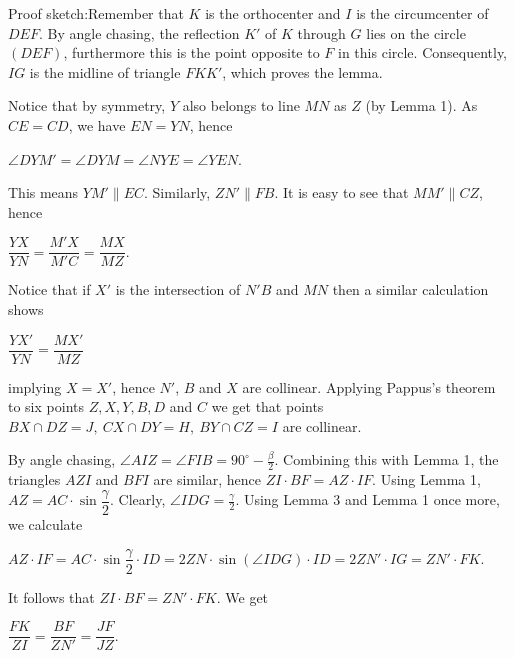 \documentclass{article}
\begin{document}
Proof sketch:Remember that \(\displaystyle K\) is the orthocenter and \(\displaystyle I\) is the circumcenter of \(\displaystyle DEF\). By angle chasing, the reflection \(\displaystyle K'\) of \(\displaystyle K\) through \(\displaystyle G\) lies on the circle \(\displaystyle (DEF)\), furthermore this is the point opposite to \(\displaystyle F\) in this circle. Consequently, \(\displaystyle IG\) is the midline of triangle \(\displaystyle FKK'\), which proves the lemma.

Notice that by symmetry, \(\displaystyle Y\) also belongs to line \(\displaystyle MN\) as \(\displaystyle Z\) (by Lemma 1). As \(\displaystyle CE=CD\), we have \(\displaystyle EN=YN\), hence

\(\displaystyle \angle DYM'=\angle DYM=\angle NYE=\angle YEN.\)

This means \(\displaystyle YM'\parallel EC\). Similarly, \(\displaystyle ZN'\parallel FB\). It is easy to see that \(\displaystyle MM'\parallel CZ\), hence

\(\displaystyle \dfrac{YX}{YN} = \dfrac{M'X}{M'C} =\dfrac{MX}{MZ} .\)

Notice that if \(\displaystyle X'\) is the intersection of \(\displaystyle N'B\) and \(\displaystyle MN\) then a similar calculation shows

\(\displaystyle \dfrac{YX'}{YN}=\dfrac{MX'}{MZ}\)

implying \(\displaystyle X=X'\), hence \(\displaystyle N'\), \(\displaystyle B\) and \(\displaystyle X\) are collinear. Applying Pappus's theorem to six points \(\displaystyle Z, X, Y, B, D\) and \(\displaystyle C\) we get that points \(\displaystyle BX\cap DZ = J, \ CX\cap DY = H, \ BY\cap CZ = I\) are collinear.

By angle chasing, \(\displaystyle \angle AIZ=\angle FIB=90^\circ-\frac{\beta}{2}\). Combining this with Lemma 1, the triangles \(\displaystyle AZI\) and \(\displaystyle BFI\) are similar, hence \(\displaystyle ZI\cdot BF = AZ\cdot IF\). Using Lemma 1, \(\displaystyle AZ=AC\cdot \sin \dfrac{\gamma}{2}\). Clearly, \(\displaystyle \angle IDG=\frac{\gamma}{2}\).  Using Lemma 3 and Lemma 1 once more, we calculate

\(\displaystyle AZ\cdot IF = AC\cdot \sin \dfrac{\gamma}{2} \cdot ID= 2ZN \cdot \sin (\angle{IDG}) \cdot ID= 2ZN'\cdot IG =ZN'\cdot FK.\)

It follows that \(\displaystyle ZI\cdot BF = ZN'\cdot FK.\) We get

\(\displaystyle \dfrac{FK}{ZI}=\dfrac{BF}{ZN'}=\dfrac{JF}{JZ}.\)
\end{document}
